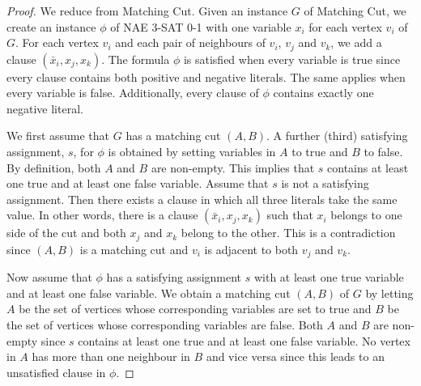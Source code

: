 \documentclass[a4paper,UKenglish,cleveref, autoref,thm-restate]{lipics-v2021}
\begin{document}
\begin{proof}
We reduce from {\sc Matching Cut}. Given an instance $G$ of {\sc Matching Cut}, we create an instance $\phi$ of {\sc NAE 3-SAT 0-1} with one variable $x_i$ for each vertex $v_i$ of $G$. For each vertex $v_i$ and each pair of neighbours of $v_i$, $v_j$ and $v_k$, we add a clause $(\bar{x}_i,x_j,x_k)$. The formula $\phi$ is satisfied when every variable is true since every clause contains both positive and negative literals. The same applies when every variable is false. Additionally, every clause of $\phi$ contains exactly one negative literal.

We first assume that $G$ has a matching cut $(A,B)$. A further (third) satisfying assignment, $s$, for $\phi$ is obtained by setting variables in $A$ to true and $B$ to false. By definition, both $A$ and $B$ are non-empty. This implies that $s$ contains at least one true and at least one false variable. Assume that $s$ is not a satisfying assignment. Then there exists a clause in which all three literals take the same value. In other words, there is a clause $(\bar{x}_i,x_j,x_k)$ such that $x_i$ belongs to one side of the cut and both $x_j$ and $x_k$ belong to the other. This is a contradiction since $(A,B)$ is a matching cut and $v_i$ is adjacent to both $v_j$ and $v_k$.

Now assume that $\phi$ has a satisfying assignment $s$ with at least one true variable and at least one false variable. We obtain a matching cut $(A,B)$ of $G$ by letting $A$ be the set of vertices whose corresponding variables are set to true and $B$ be the set of vertices whose corresponding variables are false. Both $A$ and $B$ are non-empty since $s$ contains at least one true and at least one false variable. No vertex in $A$ has more than one neighbour in $B$ and vice versa since this leads to an unsatisfied clause in $\phi$. %
\end{proof}
\end{document}
